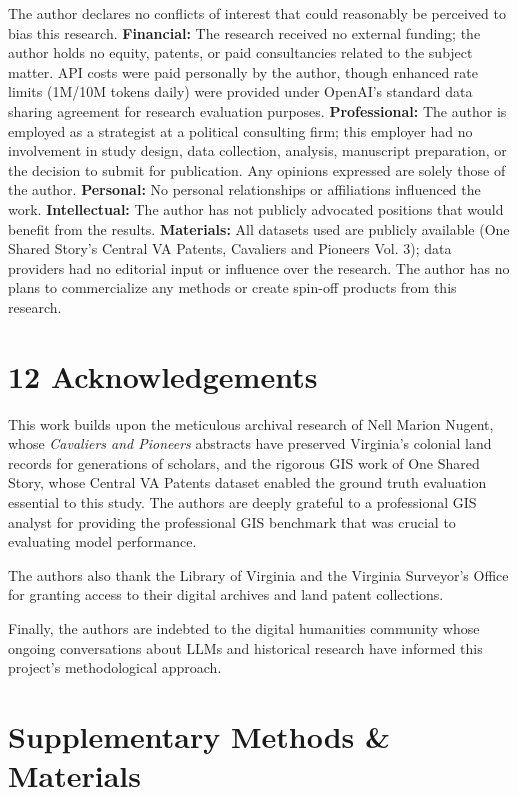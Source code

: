 The author declares no conflicts of interest that could reasonably be
perceived to bias this research. \textbf{Financial:} The research
received no external funding; the author holds no equity, patents, or
paid consultancies related to the subject matter. API costs were paid
personally by the author, though enhanced rate limits (1M/10M tokens
daily) were provided under OpenAI's standard data sharing agreement for
research evaluation purposes. \textbf{Professional:} The author is
employed as a strategist at a political consulting firm; this employer
had no involvement in study design, data collection, analysis,
manuscript preparation, or the decision to submit for publication. Any
opinions expressed are solely those of the author. \textbf{Personal:} No
personal relationships or affiliations influenced the work.
\textbf{Intellectual:} The author has not publicly advocated positions
that would benefit from the results. \textbf{Materials:} All datasets
used are publicly available (One Shared Story's Central VA Patents,
Cavaliers and Pioneers Vol. 3); data providers had no editorial input or
influence over the research. The author has no plans to commercialize
any methods or create spin-off products from this research.

\section{12 Acknowledgements}\label{acknowledgements}

This work builds upon the meticulous archival research of Nell Marion
Nugent, whose \emph{Cavaliers and Pioneers} abstracts have preserved
Virginia's colonial land records for generations of scholars, and the
rigorous GIS work of One Shared Story, whose Central VA Patents dataset
enabled the ground truth evaluation essential to this study. The authors
are deeply grateful to a professional GIS analyst \citep{Bashorun2025_gis} for
providing the professional GIS benchmark that was crucial to evaluating
model performance.

The authors also thank the Library of Virginia and the Virginia
Surveyor's Office for granting access to their digital archives and land
patent collections.

Finally, the authors are indebted to the digital humanities community
whose ongoing conversations about LLMs and historical research have
informed this project's methodological approach.


\section{Supplementary Methods \&
Materials}\label{appendix-a-supplementary-methods-materials}

